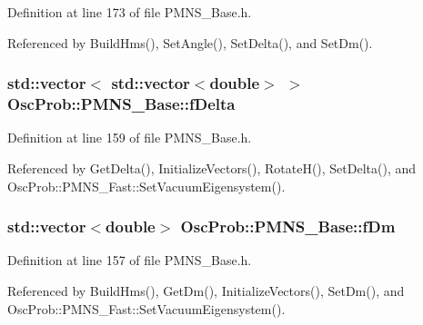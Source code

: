 Definition at line 173 of file P\+M\+N\+S\+\_\+\+Base.\+h.



Referenced by Build\+Hms(), Set\+Angle(), Set\+Delta(), and Set\+Dm().

\subsubsection[{\texorpdfstring{f\+Delta}{fDelta}}]{\setlength{\rightskip}{0pt plus 5cm}std\+::vector$<$ std\+::vector$<$double$>$ $>$ Osc\+Prob\+::\+P\+M\+N\+S\+\_\+\+Base\+::f\+Delta\hspace{0.3cm}{\ttfamily [protected]}}\hypertarget{classOscProb_1_1PMNS__Base_ab2a5fa40e689b221c8a7d2c17213810d}{}\label{classOscProb_1_1PMNS__Base_ab2a5fa40e689b221c8a7d2c17213810d}


Definition at line 159 of file P\+M\+N\+S\+\_\+\+Base.\+h.



Referenced by Get\+Delta(), Initialize\+Vectors(), Rotate\+H(), Set\+Delta(), and Osc\+Prob\+::\+P\+M\+N\+S\+\_\+\+Fast\+::\+Set\+Vacuum\+Eigensystem().

\subsubsection[{\texorpdfstring{f\+Dm}{fDm}}]{\setlength{\rightskip}{0pt plus 5cm}std\+::vector$<$double$>$ Osc\+Prob\+::\+P\+M\+N\+S\+\_\+\+Base\+::f\+Dm\hspace{0.3cm}{\ttfamily [protected]}}\hypertarget{classOscProb_1_1PMNS__Base_a406a31c3b5d620e5a0cace5b411f9f70}{}\label{classOscProb_1_1PMNS__Base_a406a31c3b5d620e5a0cace5b411f9f70}


Definition at line 157 of file P\+M\+N\+S\+\_\+\+Base.\+h.



Referenced by Build\+Hms(), Get\+Dm(), Initialize\+Vectors(), Set\+Dm(), and Osc\+Prob\+::\+P\+M\+N\+S\+\_\+\+Fast\+::\+Set\+Vacuum\+Eigensystem().

